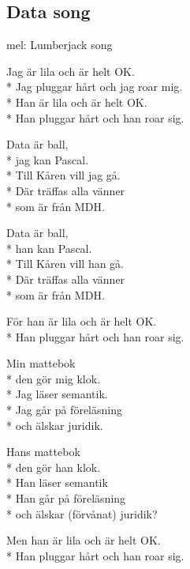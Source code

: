 \begin{SongText}
\subsection{\textbf{Data song}} 
mel: Lumberjack song
\phantom{TomRad}
\begin{Verse}
Jag är lila och är helt OK.\\*%
Jag pluggar hårt och jag roar mig.\\*%
Han är lila och är helt OK.\\*%
Han pluggar hårt och han roar sig.
\end{Verse}
\begin{Verse}
Data är ball,\\*%
jag kan Pascal.\\*%
Till Kåren vill jag gå.\\*%
Där träffas alla vänner\\*%
som är från MDH.
\end{Verse}
\begin{Verse}
Data är ball,\\*%
han kan Pascal.\\*%
Till Kåren vill han gå.\\*%
Där träffas alla vänner\\*%
som är från MDH.
\end{Verse}
\begin{Verse}
För han är lila och är helt OK.\\*%
Han pluggar hårt och han roar sig.
\end{Verse}
\begin{Verse}
Min mattebok\\*%
den gör mig klok.\\*%
Jag läser semantik.\\*%
Jag går på föreläsning\\*%
och älskar juridik.
\end{Verse}
\begin{Verse}
Hans mattebok\\*%
den gör han klok.\\*%
Han läser semantik\\*%
Han går på föreläsning\\*%
och älskar (förvånat) juridik?
\end{Verse}
\begin{Verse}
Men han är lila och är helt OK.\\*%
Han pluggar hårt och han roar sig.
\end{Verse}

\end{SongText}
